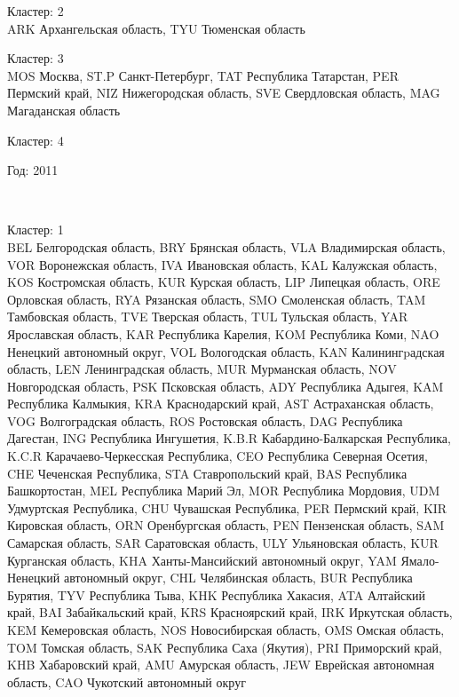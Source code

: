 \documentclass[11pt]{article}
\begin{document}
Кластер:  2 \\
ARK Архангельская область, TYU Тюменская область

Кластер:  3 \\
MOS Москва, ST.P Санкт-Петербург, TAT Республика Татарстан, PER Пермский край, NIZ Нижегородская область, SVE Свердловская область, MAG Магаданская область

Кластер:  4 \\

\begin{center}
Год:  2011
\end{center}

    \begin{center}
    \end{center}
    { \hspace*{\fill} \\}
    

Кластер:  1 \\
BEL Белгородская область, BRY Брянская область, VLA Владимирская область, VOR Воронежская область, IVA Ивановская область, KAL Калужская область, KOS Костромская область, KUR Курская область, LIP Липецкая область, ORE Орловская область, RYA Рязанская область, SMO Смоленская область, TAM Тамбовская область, TVE Тверская область, TUL Тульская область, YAR Ярославская область, KAR Республика Карелия, KOM Республика Коми, NAO Ненецкий автономный округ, VOL Вологодская область, KAN Калинингpадская область, LEN Ленинградская область, MUR Мурманская область, NOV Новгородская область, PSK Псковская область, ADY Республика Адыгея, KAM Республика Калмыкия, KRA Краснодарский край, AST Астраханская область, VOG Волгоградская область, ROS Ростовская область, DAG Республика Дагестан, ING Республика Ингушетия, K.B.R Кабардино-Балкарская Республика, K.C.R Карачаево-Черкесская Республика, CEO Республика Северная Осетия, CHE Чеченская Республика, STA Ставропольский край, BAS Республика Башкортостан, MEL Республика Марий Эл, MOR Республика Мордовия, UDM Удмуртская Республика, CHU Чувашская Республика, PER Пермский край, KIR Кировская область, ORN Оренбургская область, PEN Пензенская область, SAM Самарская область, SAR Саратовская область, ULY Ульяновская область, KUR Курганская область, KHA Ханты-Мансийский автономный округ, YAM Ямало-Ненецкий автономный округ, CHL Челябинская область, BUR Республика Бурятия, TYV Республика Тыва, KHK Республика Хакасия, ATA Алтайский край, BAI Забайкальский край, KRS Красноярский край, IRK Иркутская область, KEM Кемеровская область, NOS Новосибирская область, OMS Омская область, TOM Томская область, SAK Республика Саха (Якутия), PRI Приморский край, KHB Хабаровский край, AMU Амурская область, JEW Еврейская автономная область, CAO Чукотский автономный округ
\end{document}
